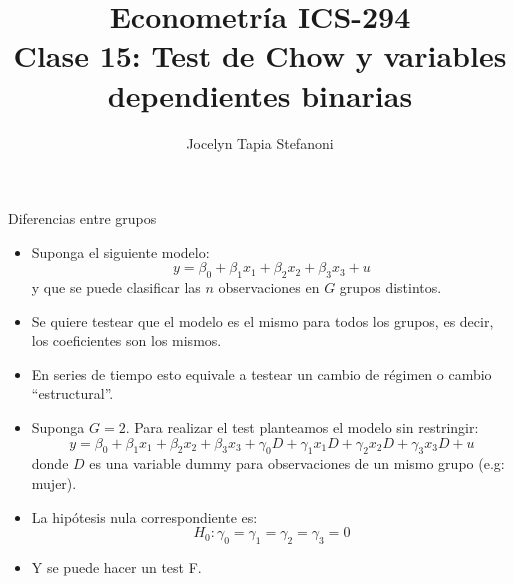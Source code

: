 \documentclass{beamer}
\title[ICS-162]{Econometría ICS-294\\ \small{Clase 15: Test de Chow y variables dependientes binarias }}
\author{Jocelyn Tapia Stefanoni}
\institute[USM]
{Universidad Técnica Federico Santa María\\ %
	\medskip
	\textit{} %
	
}
\date{}
\begin{document}
	
\begin{frame}
	\titlepage %


\end{frame}
\logo{}

\begin{frame}[shrink=10]{ Diferencias entre grupos}
\begin{itemize}
    \item Suponga el siguiente modelo:
    \[
    y = \beta_0 + \beta_1 x_1 + \beta_2 x_2 + \beta_3 x_3 + u
    \]
    y que se puede clasificar las \(n\) observaciones en \(G\) grupos distintos.
\end{itemize}

\begin{itemize}
    \item Se quiere testear que el modelo es el mismo para todos los grupos, es decir, los coeficientes son los mismos.
    \item En series de tiempo esto equivale a testear un cambio de régimen o cambio “estructural”.
\end{itemize}

\begin{itemize}
    \item Suponga \(G = 2\). Para realizar el test planteamos el modelo sin restringir:
    \[
    y = \beta_0 + \beta_1 x_1 + \beta_2 x_2 + \beta_3 x_3 + \gamma_0 D + \gamma_1 x_1 D + \gamma_2 x_2 D + \gamma_3 x_3 D + u
    \]
    donde \(D\) es una variable dummy para observaciones de un mismo grupo (e.g: mujer).
\end{itemize}

\begin{itemize}
    \item La hipótesis nula correspondiente es:
    \[
    H_0 : \gamma_0 = \gamma_1 = \gamma_2 = \gamma_3 = 0
    \]
    \item Y se puede hacer un test F.
\end{itemize}
\end{frame}
\end{document}
